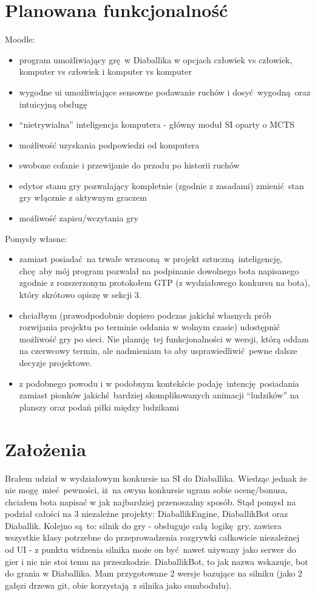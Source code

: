\documentclass[a4paper,12pt]{article}
\begin{document}
\section{Planowana funkcjonalność}
Moodle:
\begin{itemize}
\item program umożliwiający grę w Diaballika w opcjach człowiek vs człowiek, komputer vs człowiek i komputer vs komputer
\item wygodne ui umożliwiające sensowne podawanie ruchów i dosyć wygodną oraz intuicyjną obsługę
\item ``nietrywialna'' inteligencja komputera - główny moduł SI oparty o MCTS
\item możliwość uzyskania podpowiedzi od komputera
\item swobone cofanie i przewijanie do przodu po historii ruchów
\item edytor stanu gry pozwalający kompletnie (zgodnie z zasadami) zmienić stan gry włącznie z aktywnym graczem
\item możliwość zapisu/wczytania gry
\end{itemize}
Pomysły własne:
\begin{itemize}
\item zamiast posiadać na trwałe wrzuconą w projekt sztuczną inteligencję, chcę aby mój program pozwalał na podpinanie dowolnego bota napisanego
zgodnie z rozszerzonym protokołem GTP (z wydziałowego konkursu na bota), który skrótowo opiszę w sekcji 3.
\item chciałbym (prawodpodobnie dopiero podczas jakichś własnych prób rozwijania projektu po terminie oddania w wolnym czasie) udostępnić możliwość
gry po sieci. Nie planuję tej funkcjonalności w wersji, którą oddam na czerwcowy termin, ale nadmieniam to aby usprawiedliwić pewne dalsze decyzje 
projektowe.
\item z podobnego powodu i w podobnym kontekście podaję intencję posiadania zamiast pionków jakichś bardziej skomplikowanych animacji ``ludzików'' na
planszy oraz podań piłki między ludzikami
\end{itemize}

\section{Założenia}
Brałem udział w wydziałowym konkursie na SI do Diaballika. Wiedząc jednak że nie mogę mieć pewności, iż na owym konkursie ugram sobie ocenę/bonusa,
chciałem bota napisać w jak najbardziej przenoszalny sposób. Stąd pomysł na podział całości na 3 niezależne projekty: DiaballikEngine, DiaballikBot
oraz Diaballik. Kolejno są to: silnik do gry - obsługuje całą logikę gry, zawiera wszystkie klasy potrzebne do przeprowadzenia rozgrywki całkowicie
niezależnej od UI - z punktu widzenia silnika może on być nawet używany jako serwer do gier i nic nie stoi temu na przeszkodzie. DiaballikBot, to jak
nazwa wskazuje, bot do grania w Diaballika. Mam przygotowane 2 wersje bazujące na silniku (jako 2 gałęzi drzewa git, obie korzystają z silnika jako
sumbodułu).
\end{document}
